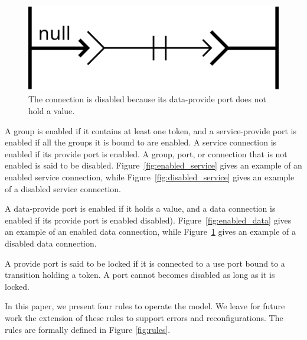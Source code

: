 \begin{figure}[t]
\begin{center}
  \includegraphics[width=0.4\columnwidth]{./images/disabled_data.pdf}
\end{center}
\caption{The connection is disabled because its data-provide port does not hold a value.}
\label{fig:disabled_data}
\end{figure}

A group is enabled if it contains at least one token, and a
service-provide port is enabled if all the groups it is bound to are
enabled. A service connection is enabled if its provide port is
enabled. A group, port, or connection that is not enabled is said to
be disabled. Figure~\ref{fig:enabled_service} gives an example of an
enabled service connection, while Figure~\ref{fig:disabled_service}
gives an example of a disabled service connection.

A data-provide port is enabled if it holds a value, and a data
connection is enabled if its provide port is enabled disabled).
Figure~\ref{fig:enabled_data} gives an example of an enabled data
connection, while Figure~\ref{fig:disabled_data} gives an example of a
disabled data connection.

A provide port is said to be locked if it is connected to a use port
bound to a transition holding a token. A port cannot becomes disabled
as long as it is locked.
    
In this paper, we present four rules to operate the \mad model. We
leave for future work the extension of these rules to support errors
and reconfigurations. The rules are formally defined in
Figure \ref{fig:rules}.

